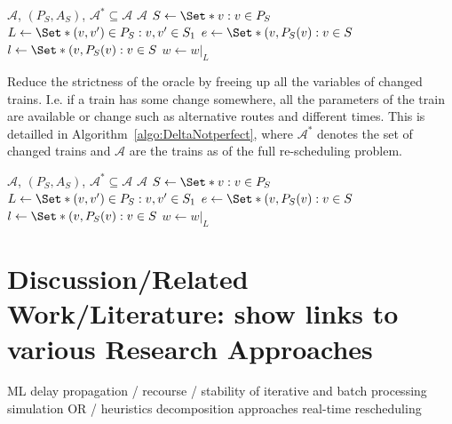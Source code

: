 \documentclass{article}
\begin{document}
\begin{algorithm}
	\caption{$transmissionchains$} \label{algo:naive}
	\begin{algorithmic}[1]
		\Require $\mathcal{A}$, $(P_S,A_S)$, $\mathcal{A}^*\subseteq\mathcal{A}$
	    \Ensure $\mathcal{A}$
	        \State $S \leftarrow \Set*{v: v\in P_{S}}$
	        \State $L \leftarrow \Set*{(v,v^\prime) \in P_{S}: v,v^\prime \in S_1}$
	        \State $e \leftarrow \Set*{(v,P_S(v): v\in S}$
	        \State $l \leftarrow \Set*{(v,P_S(v): v\in S}$
	        \State $w \leftarrow w \vert_{L}$
	    \EndFor
	\end{algorithmic}
\end{algorithm}


Reduce the strictness of the oracle by freeing up all the variables of changed trains. I.e. if a train has some change somewhere, all the parameters of the train are available or change such as alternative routes and different times. This is detailled in Algorithm~\ref{algo:DeltaNotperfect}, where $\mathcal{A}^*$ denotes the set of changed trains and $\mathcal{A}$ are the trains as of the full re-scheduling problem.


\begin{algorithm}
	\caption{$Delta_{notsoperfect}$} \label{algo:DeltaNotperfect}
	\begin{algorithmic}[1]
		\Require $\mathcal{A}$, $(P_S,A_S)$, $\mathcal{A}^*\subseteq\mathcal{A}$
	    \Ensure $\mathcal{A}$
	        \State $S \leftarrow \Set*{v: v\in P_{S}}$
	        \State $L \leftarrow \Set*{(v,v^\prime) \in P_{S}: v,v^\prime \in S_1}$
	        \State $e \leftarrow \Set*{(v,P_S(v): v\in S}$
	        \State $l \leftarrow \Set*{(v,P_S(v): v\in S}$
	        \State $w \leftarrow w \vert_{L}$
	    \EndFor
	\end{algorithmic}
\end{algorithm}

\section{Discussion/Related Work/Literature: show links to various Research Approaches}
        ML
        delay propagation / recourse / stability of iterative and batch processing
        simulation
        OR / heuristics
        decomposition approaches
        real-time rescheduling
\end{document}
